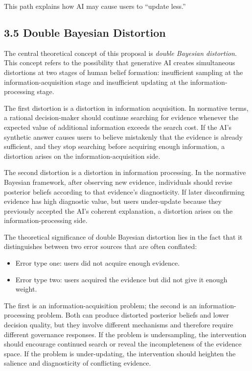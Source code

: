 This path explains how AI may cause users to ``update less.''

\subsection*{3.5 Double Bayesian Distortion}

The central theoretical concept of this proposal is \emph{double Bayesian distortion}. This concept refers to the possibility that generative AI creates simultaneous distortions at two stages of human belief formation: insufficient sampling at the information-acquisition stage and insufficient updating at the information-processing stage.

The first distortion is a distortion in information acquisition. In normative terms, a rational decision-maker should continue searching for evidence whenever the expected value of additional information exceeds the search cost. If the AI's synthetic answer causes users to believe mistakenly that the evidence is already sufficient, and they stop searching before acquiring enough information, a distortion arises on the information-acquisition side.

The second distortion is a distortion in information processing. In the normative Bayesian framework, after observing new evidence, individuals should revise posterior beliefs according to that evidence's diagnosticity. If later disconfirming evidence has high diagnostic value, but users under-update because they previously accepted the AI's coherent explanation, a distortion arises on the information-processing side.

The theoretical significance of double Bayesian distortion lies in the fact that it distinguishes between two error sources that are often conflated:
\begin{itemize}[leftmargin=1.5em]
\item Error type one: users did not acquire enough evidence.
\item Error type two: users acquired the evidence but did not give it enough weight.
\end{itemize}

The first is an information-acquisition problem; the second is an information-processing problem. Both can produce distorted posterior beliefs and lower decision quality, but they involve different mechanisms and therefore require different governance responses. If the problem is undersampling, the intervention should encourage continued search or reveal the incompleteness of the evidence space. If the problem is under-updating, the intervention should heighten the salience and diagnosticity of conflicting evidence.

